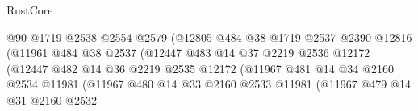 \begin{lexlean}{RustCore}
\begin{coremodule}
                                        @90
                                        @1719
                                        @2538
                                        @2554
                                        @2579
                                        (@12805
                                          @484
                                          @38
                                          @1719
                                          @2537
                                          @2390
                                          @12816
                                          (@11961
                                            @484
                                            @38
                                            @2537
                                            (@12447
                                              @483
                                              @14
                                              @37
                                              @2219
                                              @2536
                                              @12172
                                              (@12447
                                                @482
                                                @14
                                                @36
                                                @2219
                                                @2535
                                                @12172
                                                (@11967
                                                  @481
                                                  @14
                                                  @34
                                                  @2160
                                                  @2534
                                                  @11981
                                                  (@11967
                                                    @480
                                                    @14
                                                    @33
                                                    @2160
                                                    @2533
                                                    @11981
                                                    (@11967
                                                      @479
                                                      @14
                                                      @31
                                                      @2160
                                                      @2532

\end{coremodule}
\end{lexlean}
